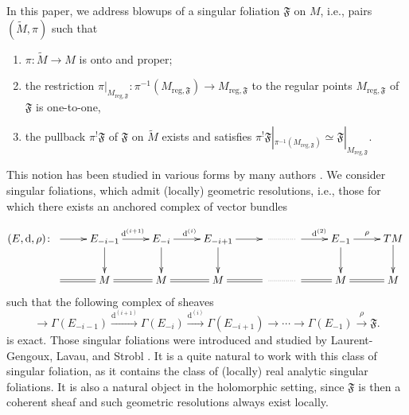\documentclass[10pt]{article}
\theoremstyle{plain}
\theoremstyle{definition}
\theoremstyle{remark}
\newcommand{\dd}{\mathrm{d}}
\begin{document}
In this paper, we address  blowups of a singular foliation  $\mathfrak F  $ on $M$, i.e.,  pairs $(\widetilde M, \pi)$ such that
\begin{enumerate}
\item $\pi\colon \widetilde M \to M$ is onto and proper;
\item the restriction $\pi|_{M_{\mathrm{reg}, \mathfrak F}} \colon \pi^{-1}(M_{\mathrm{reg}, \mathfrak F}) \to M_{\mathrm{reg}, \mathfrak F}$ to the regular points $M_{\mathrm{reg}, \mathfrak F}$ of $\mathfrak F$ is one-to-one,
\item
 the pullback $\pi^! \mathfrak F$ of $\mathfrak F$ on $\widetilde M$ exists and satisfies $\pi^! \mathfrak F |_{\pi^{-1}(M_{\mathrm{reg}, \mathfrak F})} \simeq \mathfrak F |_{M_{\mathrm{reg},\mathfrak F}}$. 
 \end{enumerate}
 This notion has been studied in various forms by many authors \cite{NistorVictor2019DoLg,DebordClaire2017BcfL, MohsenOmar}.  We %
consider singular foliations, which admit (locally) geometric resolutions, i.e., those for which there exists an anchored complex of vector bundles 

$$ (E,\dd,
\rho) \colon  \xymatrix{  \ar[r] & E_{-i-1} \ar[r]^{{\dd^{(i+1)}}} \ar[d] & 
     E_{ -i} \ar[r]^{{\dd^{(i)}}}
     \ar[d] & E_{-i+1} \ar[r] \ar[d] & \ar@{..}[r] & \ar[r]^{{\dd^{(2)}}}& E_{-1} \ar[r]^{\rho} \ar[d]& TM \ar[d] \\ 
      \ar@{=}[r] & \ar@{=}[r] M  &  \ar@{=}[r] M 
      &  \ar@{=}[r] M  &\ar@{..}[r] & \ar@{=}[r]   &  \ar@{=}[r] M  & M}
    $$
    such that the following complex of sheaves      \begin{equation}
           \label{}{\longrightarrow} \Gamma({E_{ -i-1}})
     \stackrel{\dd^{(i+1)}}{\longrightarrow} \Gamma({E_{-i}})
     \stackrel{\dd^{(i)}}{\longrightarrow}{\Gamma(E_{-i+1})}{\longrightarrow}\cdots  {\longrightarrow} \Gamma(E_{-1})  
     \stackrel{\rho}{\longrightarrow} \mathfrak F.
      \end{equation}  is exact. %
      Those singular foliations were introduced and studied by Laurent-Gengoux, Lavau, and Strobl \cite{LLS}.  It is a quite natural to work with this class of singular foliation, as it contains the class of (locally) real analytic singular foliations. It is also a natural object in the holomorphic setting, since $\mathfrak F$ is then a coherent sheaf and such geometric resolutions always exist locally.  
      
\end{document}
